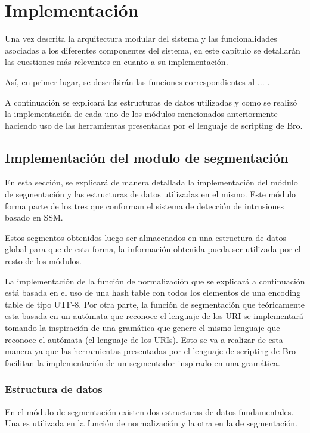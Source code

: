 \chapter{Implementación}

\label{capitulo4}

Una vez descrita la arquitectura modular del sistema y las funcionalidades asociadas a los diferentes componentes del sistema, en este capítulo se detallarán las cuestiones más relevantes en cuanto a su implementación.

Así, en primer lugar, se describirán las funciones correspondientes al ... .

A continuación se explicará las estructuras de datos utilizadas y como se realizó la implementación de cada uno de los módulos mencionados anteriormente haciendo uso de las herramientas presentadas por el lenguaje de scripting de Bro.

\section{Implementación del modulo de segmentación}

En esta sección, se explicará de manera detallada la implementación del módulo de segmentación y las estructuras de datos utilizadas en el mismo. Este módulo forma parte de los tres que conforman el sistema de detección de intrusiones basado en SSM. 

Estos segmentos obtenidos luego ser almacenados en una estructura de datos global para que de esta forma, la información obtenida pueda ser utilizada por el resto de los módulos.

La implementación de la función de normalización que se explicará a continuación está basada en el uso de una hash table con todos los elementos de una encoding table de tipo UTF-8. Por otra parte, la función de segmentación que teóricamente esta basada en un autómata que reconoce el lenguaje de los URI se implementará tomando la inspiración de una gramática que genere el mismo lenguaje que reconoce el autómata (el lenguaje de los URIs). Esto se va a realizar de esta manera ya que las herramientas presentadas por el lenguaje de scripting de Bro facilitan la implementación de un segmentador inspirado en una gramática.

\subsection{Estructura de datos}
En el módulo de segmentación existen dos estructuras de datos fundamentales. Una es utilizada en la función de normalización y la otra en la de segmentación.

